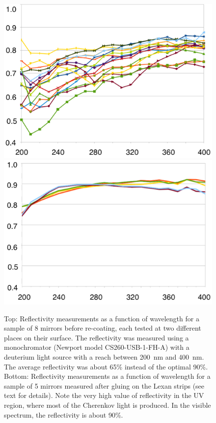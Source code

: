 \begin{figure}[ht]
\centering
	\includegraphics[width=0.99\columnwidth, height=0.7\columnwidth]{img/mirrorsReflectivityBefore.png}
	\includegraphics[width=0.99\columnwidth, height=0.7\columnwidth]{img/mirrorsReflectivityAfter.png}
	\caption{Top: Reflectivity measurements as a function of wavelength for a sample of 8 mirrors before re-coating,
          each tested at two different places on their surface. The reflectivity was measured using a monochromator
          (Newport model CS260-USB-1-FH-A) with a deuterium light source with a reach between 200~nm and 400~nm.
          The average reflectivity was about 65\% instead of the optimal 90\%. Bottom: Reflectivity measurements as a
          function of wavelength for a sample of 5 mirrors measured after gluing on the Lexan strips (see text for
          details). Note the very high value of reflectivity in the UV region, where most of the Cherenkov light is
          produced. In the visible spectrum, the reflectivity is about 90\%.}
	\label{fig:reflectivityBeforeAndAfter}
\end{figure}

